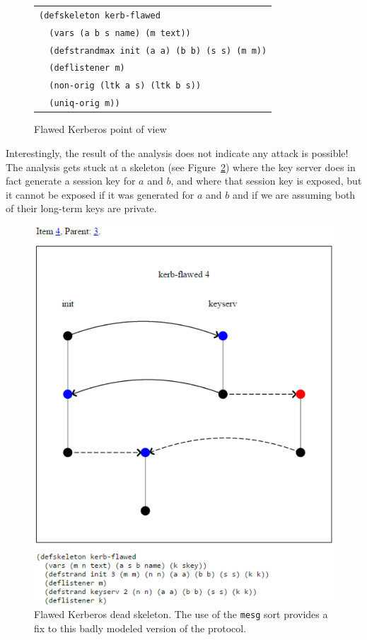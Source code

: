 \begin{figure}
\centering
\begin{tabular}{l}
\verb|(defskeleton kerb-flawed|\\
\verb|  (vars (a b s name) (m text))|\\
\verb|  (defstrandmax init (a a) (b b) (s s) (m m))|\\
\verb|  (deflistener m)|\\
\verb|  (non-orig (ltk a s) (ltk b s))|\\
\verb|  (uniq-orig m))|\\
\end{tabular}
\caption{Flawed Kerberos point of view}
\label{fig:kerb-flawed-pov}
\end{figure}

Interestingly, the result of the analysis does not indicate any attack
is possible!  The analysis gets stuck at a skeleton (see
Figure~\ref{fig:kerb-skel4}) where the key server does in fact
generate a session key for $a$ and $b$, and where that session key is
exposed, but it cannot be exposed if it was generated for $a$ and $b$
and if we are assuming both of their long-term keys are private.

\begin{figure}
\centering
\includegraphics{kerb_skel4}
\caption[Flawed Kerberos dead skeleton]{Flawed Kerberos dead skeleton.  The use of the \texttt{mesg} sort provides a fix to this badly modeled version of the protocol.}
\label{fig:kerb-skel4}
\end{figure}

